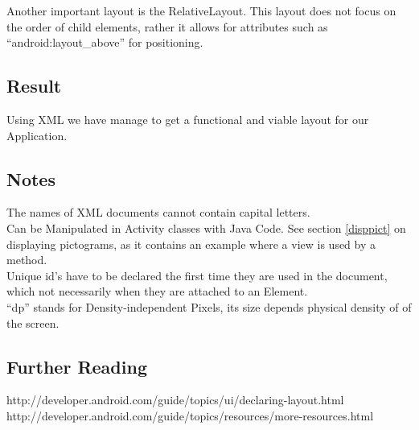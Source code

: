 Another important layout is the RelativeLayout. 
This layout does not focus on the order of child elements, rather it allows for attributes such as ``android:layout_above'' for positioning.

\subsection*{Result}

Using XML we have manage to get a functional and viable layout for our Application.

\subsection*{Notes}
The names of XML documents cannot contain capital letters.\\
Can be Manipulated in Activity classes with Java Code.
See section \ref{disppict} on displaying pictograms, as it contains an example where a view is used by a method.\\
Unique id's have to be declared the first time they are used in the document, which not necessarily when they are attached to an Element.\\
``dp'' stands for Density-independent Pixels, its size depends physical density of of the screen.

\subsection*{Further Reading}
http://developer.android.com/guide/topics/ui/declaring-layout.html\\
http://developer.android.com/guide/topics/resources/more-resources.html\\